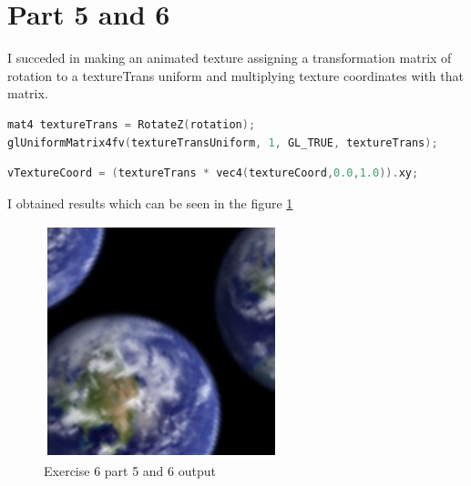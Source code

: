 \section{Part 5 and 6}
I succeded in making an animated texture assigning a transformation matrix of
rotation to a textureTrans uniform and multiplying texture coordinates with
that matrix. 
\begin{lstlisting}[language=cpp, caption={Texture animation - main.cpp}]
mat4 textureTrans = RotateZ(rotation);
glUniformMatrix4fv(textureTransUniform, 1, GL_TRUE, textureTrans);
\end{lstlisting}
\begin{lstlisting}[language=cpp, caption={Texture animation - tex-shader.vert}]
vTextureCoord = (textureTrans * vec4(textureCoord,0.0,1.0)).xy;
\end{lstlisting}
I obtained results which can be seen in the figure \ref{fig:exercise_6_part_6}
\begin{figure}[ht!]
	\begin{center}
		\includegraphics[width=.8\textwidth]{figures/exercise_6_part_6}
	\end{center}
	\vspace{-4.5ex}\caption{Exercise 6 part 5 and 6 output}
	\label{fig:exercise_6_part_6} 
\end{figure}